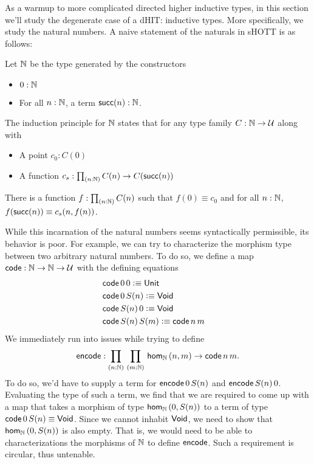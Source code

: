 \documentclass[main.tex]{subfiles}
\begin{document}
As a warmup to more complicated directed higher inductive types, in this section we'll study the degenerate case of a dHIT: inductive types. More specifically, we study the natural numbers. A naive statement of the naturals in sHOTT is as follows:
\begin{definition}
    Let $\N$ be the type generated by the constructors
    \begin{itemize}
       \item $0 : \N$
       \item For all $n : \N$, a term $\su(n) : \N$.
    \end{itemize}
    The induction principle for $\N$ states that for any type family $C : \N \to \U$ along with
    \begin{itemize}
       \item A point $c_0 : C(0)$
       \item A function $c_s : \prd{n:\N}C(n) \to C(\su(n))$
    \end{itemize}
   There is a function $f : \prd{n:\N}C(n)$ such that $f(0) \equiv c_0$ and for all $n : \N$, $f(\su(n)) \equiv c_s(n, f(n))$.
   
\end{definition}

While this incarnation of the natural numbers seems syntactically permissible, its behavior is poor. For example, we can try to 
characterize the morphism type between two arbitrary natural numbers. To do so, we define a map $\co : \N \to \N \to \U$ with the 
defining equations 
\begin{align*}
    &\co\,0\,0\defeq \Un&\\
    &\co\,0\,S(n) \defeq \vo&\\
    &\co\,S(n)\,0\defeq \vo&\\
    &\co\,S(n)\,S(m)\defeq \co \,n\,m&
\end{align*}
We immediately run into issues while trying to define $$\eco : \prd{n : \N}{m : \N} \ho[\N]{n}{m} \to \co\,n\,m.$$ To do so, we'd have to supply
a term for $\eco\,0\,S(n)$ and $\eco\,S(n)\,0$. Evaluating the type of such a term, we find that we are required to come up with a map
that takes a morphism of type $\ho[\N]{0}{S(n)}$ to a term of type $\co\,0\,S(n)\equiv \vo$. Since we cannot inhabit $\vo$, we need to show 
that $\ho[\N]{0}{S(n)}$ is also empty. That is, we would need to be able to characterizations the morphisms of $\N$ to define $\eco$. Such a requirement is circular, thus untenable.
\end{document}

